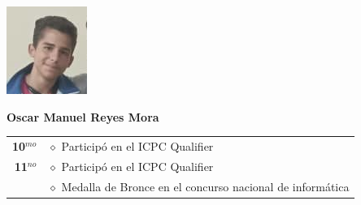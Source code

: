 \begin{minipage}{0.2\textwidth}
	\includegraphics[width=\linewidth]{img/concursantes/oscar.png} %
\end{minipage}
\hfill
\begin{minipage}{0.7\textwidth}
	\textbf{Oscar Manuel Reyes Mora}
	
	\vspace*{0.1in}
	\begin{tabular}{rl}
		
		\textbf{10$^{mo}$} & $\diamond$ Participó en el ICPC Qualifier \\
		
		\textbf{11$^{no}$} 
		& $\diamond$ Participó en el ICPC Qualifier \\
		& $\diamond$ Medalla de Bronce en el concurso nacional de informática \\
		
		
		
	\end{tabular}
\end{minipage}

\vspace*{0.2in}


